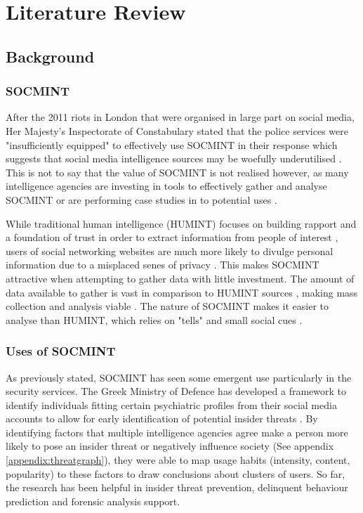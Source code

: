 \documentclass[12pt]{article}
\begin{document}
\newpage
\section{Literature Review}
\subsection{Background}
\subsubsection{SOCMINT}
After the 2011 riots in London that were organised in large part on social media, Her Majesty's Inspectorate of Constabulary stated that the police services were "insufficiently equipped" to effectively use SOCMINT in their response \citep{socmintpublicsafety} which suggests that social media intelligence sources may be woefully underutilised \citep{socmintoverview}. This is not to say that the value of SOCMINT is not realised however, as many intelligence agencies are investing in tools to effectively gather and analyse SOCMINT \citep{socmintpublicsafety} or are performing case studies in to potential uses \citep{bostonbombingcasestudy}.

While traditional human intelligence (HUMINT) focuses on building rapport and a foundation of trust in order to extract information from people of interest \citep{humintinterrogators}, users of social networking websites are much more likely to divulge personal information due to a misplaced senes of privacy \citep{socialmediacontent}. This makes SOCMINT attractive when attempting to gather data with little investment. The amount of data available to gather is vast in comparison to HUMINT sources \citep{socmintoverview}, making mass collection and analysis viable \citep{prismslides}. The nature of SOCMINT makes it easier to analyse than HUMINT, which relies on "tells" and small social cues \citep{humintinterrogators}.

\subsubsection{Uses of SOCMINT}
As previously stated, SOCMINT has seen some emergent use particularly in the security services. The Greek Ministry of Defence has developed a framework to identify individuals fitting certain psychiatric profiles from their social media accounts to allow for early identification of potential insider threats \citep{behaviourdetection}. By identifying factors that multiple intelligence agencies agree make a person more likely to pose an insider threat or negatively influence society (See appendix \ref{appendix:threatgraph}), they were able to map usage habits (intensity, content, popularity) to these factors to draw conclusions about clusters of users. So far, the research has been helpful in insider threat prevention, delinquent behaviour prediction and forensic analysis support.
\end{document}
